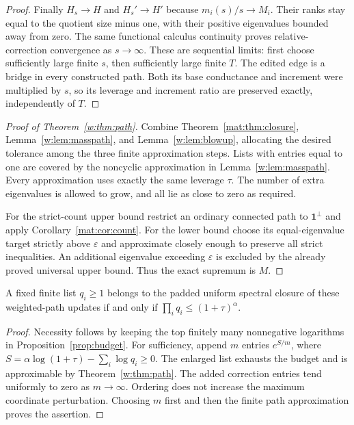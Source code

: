\begin{proof}
Finally $H_s\to H$ and $H_s'\to H'$ because $m_i(s)/s\to M_i$.
Their ranks stay equal to the quotient size minus one, with their
positive eigenvalues bounded away from zero. The same functional
calculus continuity proves relative-correction convergence as
$s\to\infty$. These are sequential limits: first choose sufficiently
large finite $s$, then sufficiently large finite $T$.
The edited edge is a bridge in every constructed path. Both its base
conductance and increment were multiplied by $s$, so its leverage
and increment ratio are preserved exactly, independently of $T$.
\end{proof}

\begin{proof}[Proof of Theorem~\ref{w:thm:path}]
Combine Theorem~\ref{mat:thm:closure}, Lemma~\ref{w:lem:masspath}, and
Lemma~\ref{w:lem:blowup}, allocating the desired tolerance among the
three finite approximation steps. Lists with entries equal to one
are covered by the noncyclic approximation in
Lemma~\ref{w:lem:masspath}. Every approximation uses exactly the same
leverage $\tau$. The number of extra eigenvalues is allowed to grow,
and all lie as close to zero as required.

For the strict-count upper bound restrict an ordinary connected path
to $\mathbf1^\perp$ and apply Corollary~\ref{mat:cor:count}.
For the lower bound choose its equal-eigenvalue target strictly above
$\varepsilon$ and approximate closely enough to preserve all strict
inequalities. An additional eigenvalue exceeding $\varepsilon$ is
excluded by the already proved universal upper bound. Thus the exact
supremum is $M$.
\end{proof}


\begin{corollary}\label{w:cor:finite-target}
A fixed finite list $q_i\ge1$ belongs to the padded uniform spectral
closure of these weighted-path updates if and only if
$\prod_i q_i\le(1+\tau)^\alpha$.
\end{corollary}
\begin{proof}
Necessity follows by keeping the top finitely many nonnegative
logarithms in Proposition~\ref{prop:budget}. For sufficiency, append
$m$ entries $e^{S/m}$, where
$S=\alpha\log(1+\tau)-\sum_i\log q_i\ge0$.
The enlarged list exhausts the budget and is approximable by
Theorem~\ref{w:thm:path}. The added correction entries tend uniformly
to zero as $m\to\infty$. Ordering does not increase the maximum
coordinate perturbation. Choosing $m$ first and then the finite path
approximation proves the assertion.
\end{proof}

